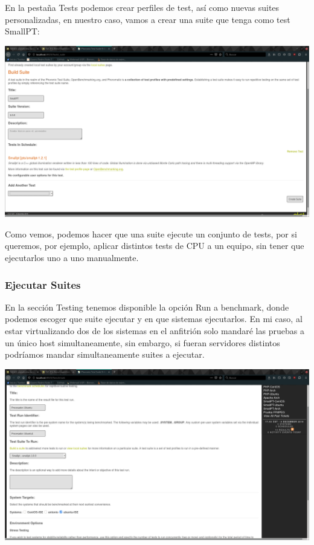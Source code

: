 \documentclass[12pt, spanish]{article}
\begin{document}
En la pestaña Tests podemos crear perfiles de test, así como nuevas suites personalizadas, en nuestro caso, vamos a crear una suite que tenga como test SmallPT:

\begin{center}
\includegraphics[scale=0.25]{phoromatic_suite.png}
\end{center}

Como vemos, podemos hacer que una suite ejecute un conjunto de tests, por si queremos, por ejemplo, aplicar distintos tests de CPU a un equipo, sin tener que ejecutarlos uno a uno manualmente.

\subsubsection{Ejecutar Suites}

En la sección Testing tenemos disponible la opción Run a benchmark, donde podemos escoger que suite ejecutar y en que sistemas ejecutarlos. En mi caso, al estar virtualizando dos de los sistemas en el anfitrión solo mandaré las pruebas a un único host simultaneamente, sin embargo, si fueran servidores distintos podríamos mandar simultaneamente suites a ejecutar.

\begin{center}
\includegraphics[scale=0.25]{phoromatic_exec.png}
\end{center}
\end{document}
